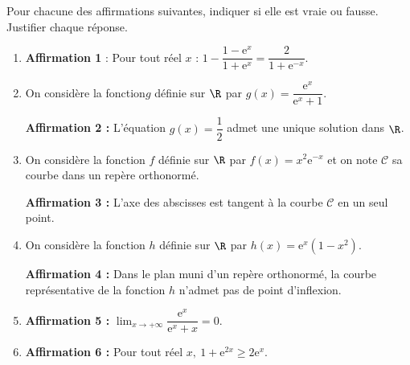 \medskip

Pour chacune des affirmations suivantes, indiquer si elle est vraie ou fausse. Justifier chaque réponse.

\medskip

\begin{enumerate}
\item \textbf{Affirmation 1} : Pour tout réel $x$  : $1 - \dfrac{1 - \text{e}^x}{1 + \text{e}^x} = \dfrac{2}{1 + \text{e}^{-x}}$.
\item On considère la fonction$g$ définie sur $\R$ par $g(x) = \dfrac{\text{e}^x}{\text{e}^x + 1}$.

\textbf{Affirmation 2 : } L'équation $g(x) = \dfrac12$ admet une unique solution dans $\R$.
\item On considère la fonction $f$ définie sur $\R$ par $f(x) = x^2\text{e}^{-x}$ et on note 
$\mathcal{C}$ sa courbe dans un repère orthonormé.

\textbf{Affirmation 3 : } L'axe des abscisses est tangent à la courbe $\mathcal{C}$ en un seul point.
\item On considère la fonction $h$ définie sur $\R$ par $h(x) = \text{e}^x\left(1 -  x^2\right)$.

\textbf{Affirmation 4 :} Dans le plan muni d'un repère orthonormé, la courbe représentative de la fonction $h$ n'admet pas de point d'inflexion.

\item \textbf{Affirmation 5 :} $\displaystyle\lim_{x \to + \infty} \dfrac{\text{e}^x}{\text{e}^x + x} = 0$.

\item \textbf{Affirmation 6 :} Pour tout réel $x,\: 1 + \text{e}^{2x} \geqslant 2\text{e}^x$.
\end{enumerate}
